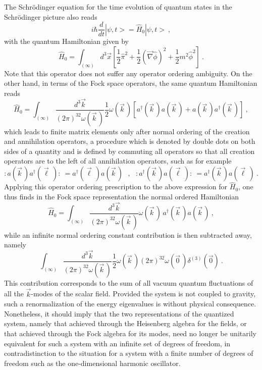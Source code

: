 \documentclass[a4paper,11pt]{article}
\begin{document}
The Schr\"odinger equation for the time evolution of quantum states in the
Schr\"odinger picture also reads
\begin{equation}
i\hbar\frac{d}{dt}|\psi,t>=\hat{H}_0|\psi,t>\ ,
\end{equation}
with the quantum Hamiltonian given by
\begin{equation}
\hat{H}_0=\int_{(\infty)}d^3\vec{x}\left[
\frac{1}{2}\hat{\pi}^2+\frac{1}{2}\left(\vec{\nabla}\hat{\phi}\right)^2+
\frac{1}{2}m^2\hat{\phi}^2\right]\ .
\end{equation}
Note that this operator does not suffer any operator ordering ambiguity.
On the other hand, in terms of the Fock space operators, the same
quantum Hamiltonian reads
\begin{equation}
\hat{H}_0=\int_{(\infty)}\frac{d^3\vec{k}}{(2\pi)^32\omega(\vec{k}\,)}
\frac{1}{2}\omega(\vec{k}\,)\left[a^\dagger(\vec{k}\,)a(\vec{k}\,)+
a(\vec{k}\,)a^\dagger(\vec{k}\,)\right]\ ,
\end{equation}
which leads to finite matrix elements only after normal ordering
of the creation and annihilation operators, a procedure which is denoted by 
double dots on both sides of a quantity and is defined by
commuting all operators so that all creation operators are to the left
of all annihilation operators, such as for example
\begin{equation}
:a(\vec{k}\,)a^\dagger(\vec{\ell}\,):\ =a^\dagger(\vec{\ell}\,)a(\vec{k}\,)
\ \ \ ,\ \ \ 
:a^\dagger(\vec{k}\,)a(\vec{\ell}\,):\ =a^\dagger(\vec{k}\,)a(\vec{\ell}\,)\ .
\end{equation}
Applying this operator ordering prescription to the above expression
for $\hat{H}_0$, one thus finds in the Fock space representation the
normal ordered Hamiltonian
\begin{equation}
\hat{H}_0=\int_{(\infty)}\frac{d^3\vec{k}}{(2\pi)^32\omega(\vec{k}\,)}
\omega(\vec{k}\,)\,a^\dagger(\vec{k}\,)a(\vec{k}\,)\ ,
\label{eq:normalorderedH0}
\end{equation}
while an infinite normal ordering constant contribution is then
subtracted away, namely
\begin{equation}
\int_{(\infty)}\frac{d^3\vec{k}}{(2\pi)^32\omega(\vec{k}\,)}
\frac{1}{2}\omega(\vec{k}\,)(2\pi)^32\omega(\vec{0}\,)\delta^{(3)}(\vec{0})\ .
\end{equation}
This contribution corresponds to the sum of all vacuum quantum fluctuations
of all the $\vec{k}$-modes of the scalar field. Provided the system is
not coupled to gravity, such a renormalization of the energy eigenvalues
is without physical consequence. Nonetheless, it should imply that the
two representations of the quantized system, namely that achieved through
the Heisenberg algebra for the fields, or that achieved through the
Fock algebra for its modes, need no longer be unitarily equivalent
for such a system with an infinite set of degrees of freedom,\cite{CCR} in
contradistinction to the situation for a system with a finite number
of degrees of freedom such as the one-dimensional harmonic oscillator.
\end{document}
